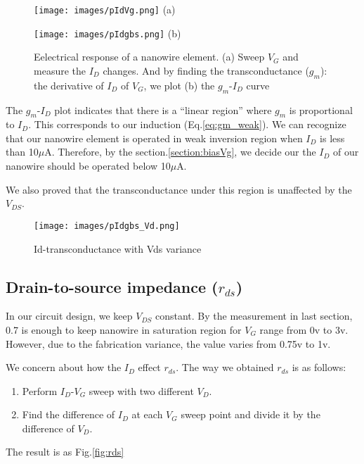 \begin{figure}[!htbp]
    \centering
    \begin{minipage}[t][0.1\textheight]{1\textwidth}
        \centering
        \texttt{[image: images/pIdVg.png]}
        (a)
    \end{minipage}
    \hfill
    \begin{minipage}[t][0.1\textheight]{1\textwidth}
        \centering
        \texttt{[image: images/pIdgbs.png]}
        (b)
    \end{minipage}
    \caption{Eelectrical response of a nanowire element. (a) Sweep $V_G$ and measure the $I_D$ changes. And by finding the transconductance ($g_m$): the derivative of $I_D$ of $V_G$, we plot (b) the $g_m$-$I_D$ curve}
    \label{fig:pIdVg}
\end{figure}

The $g_m$-$I_D$ plot indicates that there is a ``linear region'' where $g_m$ is proportional to $I_D$.
This corresponds to our induction (Eq.\ref{eq:gm_weak}).
We can recognize that our nanowire element is operated in weak inversion region when $I_D$ is less than 10$\mu$A.
Therefore, by the section.\ref{section:biasVg}, we decide our the $I_D$ of our nanowire should be operated below 10$\mu$A.

We also proved that the transconductance under this region is unaffected by the $V_{DS}$.

\begin{figure}[!htbp]
    \centering
    \texttt{[image: images/pIdgbs\_Vd.png]}
    \caption{Id-transconductance with Vds variance}
    \label{fig:Idgbs_Vd}
\end{figure}

\subsection{Drain-to-source impedance ($r_{ds}$)}
In our circuit design, we keep $V_{DS}$ constant.
By the measurement in last section, 0.7 is enough to keep nanowire in saturation region for $V_G$ range from 0v to 3v.
However, due to the fabrication variance, the value varies from 0.75v to 1v.

We concern about how the $I_D$ effect $r_{ds}$.
The way we obtained $r_{ds}$ is as follows:
\begin{enumerate}
    \item Perform $I_D$-$V_G$ sweep with two different $V_D$.
    \item Find the difference of $I_D$ at each $V_G$ sweep point and divide it by the difference of $V_D$.
\end{enumerate}
The result is as Fig.\ref{fig:rds}

